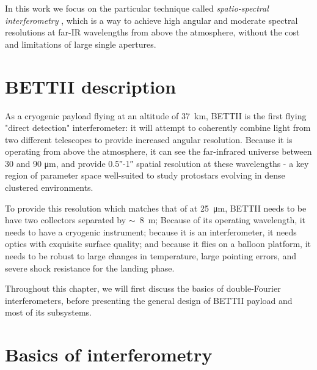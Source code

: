 In this work we focus on the particular technique called \textit{spatio-spectral interferometry} \citep{Mariotti:1988vea}, which is a way to achieve 
high angular and moderate spectral resolutions at far-IR wavelengths from above the atmosphere, without the cost and limitations of large single apertures. 


%


\section{BETTII description}

As a cryogenic payload flying at an altitude of \SI{37}{\kilo\meter}, BETTII is the first flying "direct detection" interferometer: it will attempt to coherently combine light from two different telescopes to provide increased angular resolution. Because it is operating from above the atmosphere, it can see the far-infrared universe between 30 and 90 \si{\micro\meter}, and provide \ang{;;0.5}-\ang{;;1} spatial resolution at these wavelengths - a key region of parameter space well-suited to study protostars evolving in dense clustered environments.

To provide this resolution which matches that of \JWST  at \SI{25}{\micro\meter}, BETTII needs to be have two collectors separated by $\sim$~\SI{8}{\meter}; Because of its operating wavelength, it needs to have a cryogenic instrument; because it is an interferometer, it needs optics with exquisite surface quality; and because it flies on a balloon platform, it needs to be robust to large changes in temperature, large pointing errors, and severe shock resistance for the landing phase.

Throughout this chapter, we will first discuss the basics of double-Fourier interferometers, before presenting the general design of BETTII payload and most of its subsystems.


\section{Basics of interferometry}

